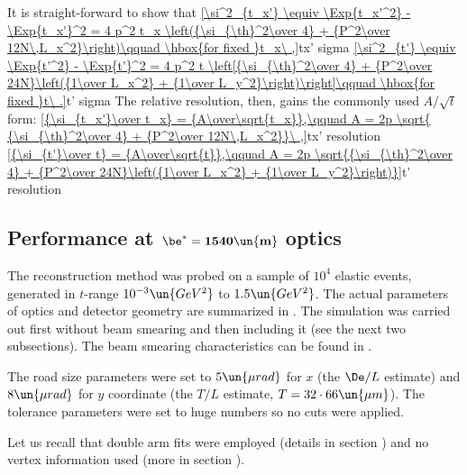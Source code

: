 It is straight-forward to show that
\eqref{\si^2_{t_x'} \equiv \Exp{t_x'^2} - \Exp{t_x'}^2 = 4 p^2 t_x \left({\si_{\th}^2\over 4} + {P^2\over 12N\,L_x^2}\right)\qquad \hbox{for fixed }t_x\ ,}{tx' sigma}
\eqref{\si^2_{t'} \equiv \Exp{t'^2} - \Exp{t'}^2 = 4 p^2 t \left[{\si_{\th}^2\over 4} + {P^2\over 24N}\left({1\over L_x^2} + {1\over L_y^2}\right)\right]\qquad \hbox{for fixed }t\ .}{t' sigma}
The relative resolution, then, gains the commonly used $A/\sqrt{t}$ form:
\eqref{{\si_{t_x'}\over t_x}  = {A\over\sqrt{t_x}},\qquad A = 2p \sqrt{ {\si_{\th}^2\over 4} + {P^2\over 12N\,L_x^2}}\ ,}{tx' resolution}
\eqref{{\si_{t'}\over t}  = {A\over\sqrt{t}},\qquad A = 2p \sqrt{{\si_{\th}^2\over 4} + {P^2\over 24N}\left({1\over L_x^2} + {1\over L_y^2}\right)}}{t' resolution}

\iffalse
One may also define variable $\de$
\eqref{\de^2 = {(t_x' - t_x)^2\over t_x^2} \Rightarrow \sqrt{\Exp{\de^2}} = {\si_{t_x'}\over t_x}}{delta for tx}
\fi

\subsection[1540]{Performance at $\mathbf{\be^*=1540\un{m}}$ optics}

The reconstruction method was probed on a sample of $10^4$ elastic events, generated in $t$-range $10^{-3}\un{GeV^2}$ to $1.5\un{GeV^2}$. The actual parameters of optics and detector geometry are summarized in . The simulation was carried out first without beam smearing and then including it (see the next two subsections). The beam smearing characteristics can be found in .

The road size parameters were set to $5\un{\mu rad}$ for $x$ (the $\De/L$ estimate) and $8\un{\mu rad}$ for $y$ coordinate (the $T/L$ estimate, $T = 32\cdot 66\un{\mu m}$). The tolerance parameters were set to huge numbers so no cuts were applied.

Let us recall that double arm fits were employed (details in section ) and no vertex information used (more in section ).


